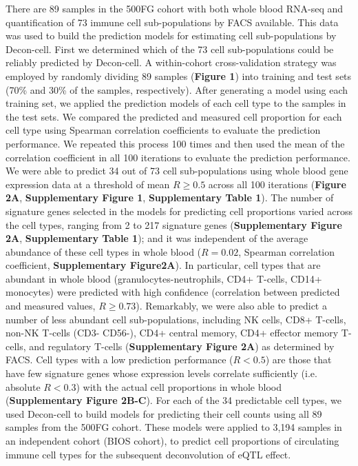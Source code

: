 There are 89 samples in the 500FG cohort with both whole blood RNA-seq and quantification of 73 immune cell sub-populations by FACS available. This data was used to build the prediction models for estimating cell sub-populations by Decon-cell. First we determined which of the 73 cell sub-populations could be reliably predicted by Decon-cell. A within-cohort cross-validation strategy was employed by randomly dividing 89 samples (\textbf{Figure 1}) into training and test sets (70\% and 30\% of the samples, respectively). After generating a model using each training set, we applied the prediction models of each cell type to the samples in the test sets. We compared the predicted and measured cell proportion for each cell type using Spearman correlation coefficients to evaluate the  prediction performance. We repeated this process 100 times and then used the mean of the correlation coefficient in all 100 iterations to evaluate the prediction performance. We were able to predict 34 out of 73 cell sub-populations using whole blood gene expression data at a threshold of mean $R \geq 0.5$ across all 100 iterations (\textbf{Figure 2A}, \textbf{Supplementary Figure 1}, \textbf{Supplementary Table 1}). The number of signature genes selected in the models for predicting cell proportions varied across the cell types, ranging from 2 to 217 signature genes (\textbf{Supplementary Figure 2A}, \textbf{Supplementary Table 1}); and it was independent of the average abundance of these cell types in whole blood ($R = 0.02$, Spearman correlation coefficient, \textbf{Supplementary Figure2A}). In particular, cell types that are abundant in whole blood (granulocytes-neutrophils, CD4+ T-cells, CD14+ monocytes) were predicted with high confidence (correlation between predicted and measured values, $R \geq 0.73$). Remarkably, we were also able to predict a number of less abundant cell sub-populations, including NK cells, CD8+ T-cells, non-NK T-cells (CD3- CD56-), CD4+ central memory, CD4+ effector memory T-cells, and regulatory T-cells (\textbf{Supplementary Figure 2A}) as determined by FACS. Cell types with a low prediction performance ($R < 0.5$) are those that have few signature genes whose expression levels correlate sufficiently (i.e. absolute $R < 0.3$) with the actual cell proportions in whole blood (\textbf{Supplementary Figure 2B-C}). For each of the 34 predictable cell types, we used Decon-cell to build models for predicting their cell counts using all 89 samples from the 500FG cohort. These models were applied to 3,194 samples in an independent cohort (BIOS cohort), to predict cell proportions of circulating immune cell types for the subsequent deconvolution of eQTL effect. 

